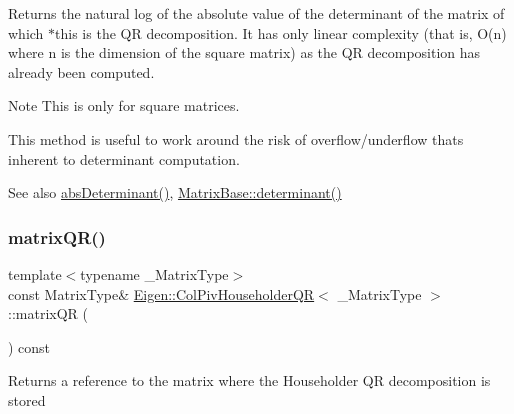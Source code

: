 \begin{DoxyReturn}{Returns}
the natural log of the absolute value of the determinant of the matrix of which $\ast$this is the QR decomposition. It has only linear complexity (that is, O(n) where n is the dimension of the square matrix) as the QR decomposition has already been computed.
\end{DoxyReturn}
\begin{DoxyNote}{Note}
This is only for square matrices.

This method is useful to work around the risk of overflow/underflow that\textquotesingle{}s inherent to determinant computation.
\end{DoxyNote}
\begin{DoxySeeAlso}{See also}
\mbox{\hyperlink{class_eigen_1_1_col_piv_householder_q_r_ac87c3bf42098d6f7324dafbc50fa83f7}{abs\+Determinant()}}, \mbox{\hyperlink{class_eigen_1_1_matrix_base_a7ad8f77004bb956b603bb43fd2e3c061}{Matrix\+Base\+::determinant()}} 
\end{DoxySeeAlso}
\mbox{\label{class_eigen_1_1_col_piv_householder_q_r_aa572ac050c8d4fadd4f08a87f6b1e62b}} 
\subsubsection{\texorpdfstring{matrixQR()}{matrixQR()}}
{\footnotesize\ttfamily template$<$typename \+\_\+\+Matrix\+Type$>$ \\
const Matrix\+Type\& \mbox{\hyperlink{class_eigen_1_1_col_piv_householder_q_r}{Eigen\+::\+Col\+Piv\+Householder\+QR}}$<$ \+\_\+\+Matrix\+Type $>$\+::matrix\+QR (\begin{DoxyParamCaption}{ }\end{DoxyParamCaption}) const\hspace{0.3cm}{\ttfamily [inline]}}

\begin{DoxyReturn}{Returns}
a reference to the matrix where the Householder QR decomposition is stored 
\end{DoxyReturn}
\mbox{\label{class_eigen_1_1_col_piv_householder_q_r_a44c534d47bde6b67ce4b5247d142ef30}} 
